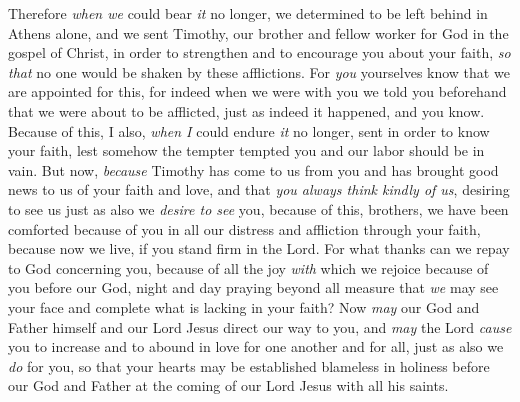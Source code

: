 \begin{biblechapter} %
 Therefore \textit{when we} could bear \textit{it} no longer, we determined to be left behind in Athens alone,
\verse and we sent Timothy, our brother and fellow worker for God in the gospel of Christ, in order to strengthen and to encourage you about your faith,
\verse \textit{so that} no one would be shaken by these afflictions. For \textit{you} yourselves know that we are appointed for this,
\verse for indeed when we were with you we told you beforehand that we were about to be afflicted, just as indeed it happened, and you know.
\verse Because of this, I also, \textit{when I} could endure \textit{it} no longer, sent in order to know your faith, lest somehow the tempter tempted you and our labor should be in vain.
 But now, \textit{because} Timothy has come to us from you and has brought good news to us of your faith and love, and that \textit{you always think kindly of us}, desiring to see us just as also we \textit{desire to see} you,
\verse because of this, brothers, we have been comforted because of you in all our distress and affliction through your faith,
\verse because now we live, if you stand firm in the Lord.
\verse For what thanks can we repay to God concerning you, because of all the joy \textit{with} which we rejoice because of you before our God,
\verse night and day praying beyond all measure that \textit{we} may see your face and complete what is lacking in your faith?
\verse Now \textit{may} our God and Father himself and our Lord Jesus direct our way to you,
\verse and \textit{may} the Lord \textit{cause} you to increase and to abound in love for one another and for all, just as also we \textit{do} for you,
\verse so that your hearts may be established blameless in holiness before our God and Father at the coming of our Lord Jesus with all his saints.
\end{biblechapter}

